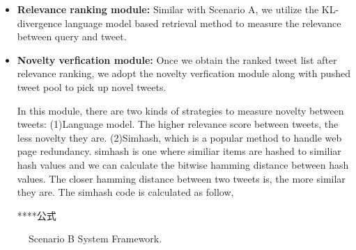 \begin{itemize}
\item \textbf{Relevance ranking module:} Similar with Scenario A, we utilize the KL-divergence language model based retrieval method to measure the relevance between query and tweet.

\item \textbf{Novelty verfication module:} Once we obtain the ranked tweet list after relevance ranking, we adopt the novelty verfication module along with pushed tweet pool to pick up novel tweets.


In this module, there are two kinds of strategies to measure novelty between tweets: (1)Language model. The higher relevance score between tweets, the less novelty they are. (2)Simhash, which is a popular method to handle web page redundancy. simhash is one where similiar items are hashed to similiar hash values and we can calculate the bitwise hamming distance between hash values. The closer hamming distance between two tweets is, the more similar they are. The simhash code is calculated as follow,

****公式
\end{itemize}

\begin{figure}[htbp]
\centering
{
}
\caption{Scenario B System Framework.}
\label{fig:Bsys}
\end{figure}




